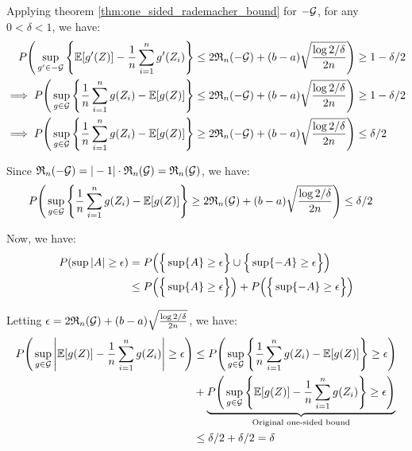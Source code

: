 \begin{solution*}
    Applying theorem \ref{thm:one_sided_rademacher_bound} for $-\mathcal{G}$, for any $0<\delta<1$, we have:
    \begin{align*}
        P\Bigg( 
            \sup_{g'\in -\mathcal{G}}\Bigg\{ 
                \mathbb{E}[g'(Z)] - \frac{1}{n}\sum_{i=1}^n g'(Z_i)
             \Bigg\} \le 2\mathfrak{R}_n(-\mathcal{G}) + (b-a)\sqrt{\frac{\log 2/\delta}{2n}}
         \Bigg)&\ge 1 - \delta/2 \\
        \implies P\Bigg( 
            \sup_{g\in\mathcal{G}}\Bigg\{ 
                \frac{1}{n}\sum_{i=1}^n g(Z_i) - \mathbb{E}[g(Z)]
             \Bigg\} \le 2\mathfrak{R}_n(-\mathcal{G}) + (b-a)\sqrt{\frac{\log 2/\delta}{2n}}
         \Bigg)&\ge 1 - \delta/2 \\
        \implies P\Bigg( 
            \sup_{g\in\mathcal{G}}\Bigg\{ 
                \frac{1}{n}\sum_{i=1}^n g(Z_i) - \mathbb{E}[g(Z)]
             \Bigg\} \ge 2\mathfrak{R}_n(-\mathcal{G}) + (b-a)\sqrt{\frac{\log 2/\delta}{2n}}
         \Bigg)&\le \delta/2
    \end{align*}

    \noindent Since $\mathfrak{R}_n(-\mathcal{G}) = |-1|\cdot \mathfrak{R}_n(\mathcal{G}) = \mathfrak{R}_n(\mathcal{G})$, we have:
    \begin{align*}
        P\Bigg( 
            \sup_{g\in\mathcal{G}}\Bigg\{ 
                \frac{1}{n}\sum_{i=1}^n g(Z_i) - \mathbb{E}[g(Z)]
             \Bigg\} \ge 2\mathfrak{R}_n(\mathcal{G}) + (b-a)\sqrt{\frac{\log 2/\delta}{2n}}
         \Bigg)&\le \delta/2
    \end{align*}

    \noindent Now, we have:
    \begin{align*}
        P(\sup|A| \ge \epsilon) &= P\Big( \Big\{ \sup\{A\} \ge \epsilon \Big\} \cup \Big\{ \sup\{-A\} \ge \epsilon \Big\} \Big) \\
        &\le P\Big( \Big\{ \sup\{A\} \ge \epsilon \Big\} \Big) + P\Big( \Big\{ \sup\{-A\} \ge \epsilon \Big\} \Big)
    \end{align*}

    \noindent Letting $\epsilon = 2\mathfrak{R}_n(\mathcal{G}) + (b-a)\sqrt{\frac{\log 2/\delta}{2n}}$, we have:
    \begin{align*}
        P\Bigg( 
            \sup_{g\in\mathcal{G}}\Bigg| 
                \mathbb{E}[g(Z)] - \frac{1}{n}\sum_{i=1}^n g(Z_i)
         \Bigg| \ge \epsilon \Bigg)
        &\le P\Bigg( 
            \sup_{g\in\mathcal{G}}\Bigg\{ 
                \frac{1}{n}\sum_{i=1}^n g(Z_i) - \mathbb{E}[g(Z)]
             \Bigg\} \ge \epsilon
         \Bigg) \\
        & + \underbrace{P\Bigg( 
            \sup_{g\in\mathcal{G}}\Bigg\{ 
                \mathbb{E}[g(Z)] - \frac{1}{n}\sum_{i=1}^n g(Z_i)
             \Bigg\} \ge \epsilon
         \Bigg)}_{\text{Original one-sided bound}} \\
        &\le \delta/2 + \delta/2 = \delta
    \end{align*}


\end{solution*}
